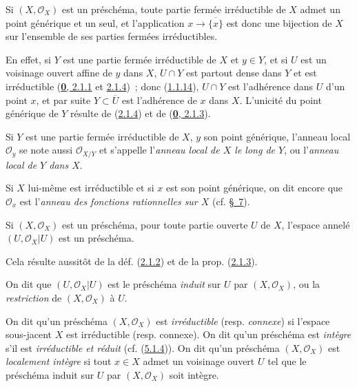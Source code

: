 \begin{proposition}[2.1.5]
\label{I.2.1.5-fr}
Si $(X,\mathscr{O}_X)$ est un préschéma, toute partie fermée irréductible de
$X$ admet un point générique et un seul, et l'application
$x\to\overline{\{x\}}$ est donc une bijection de $X$ sur l'ensemble
de ses parties fermées irréductibles.
\end{proposition}

En effet, si $Y$ est une partie fermée irréductible de $X$ et $y\in Y$, et si
$U$ est un voisinage ouvert affine de $y$ dans $X$, $U\cap Y$ est partout
dense dans $Y$ et est irréductible
(\hyperref[0.2.1.1-fr]{\textbf{0}, 2.1.1} et
\hyperref[0.2.1.4-fr]{2.1.4})~; donc
(\hyperref[I.1.1.14-fr]{1.1.14}), $U\cap Y$ est l'adhérence dans $U$ d'un
point $x$, et par suite $Y\subset\overline{U}$ est l'adhérence de $x$ dans
$X$. L'unicité du point générique de $Y$ résulte de
(\hyperref[I.2.1.4-fr]{2.1.4}) et de
(\hyperref[0.2.1.3-fr]{\textbf{0}, 2.1.3}).

\begin{env}[2.1.6]
\label{I.2.1.6-fr}
Si $Y$ est une partie fermée irréductible de $X$, $y$ son point générique,
l'anneau local $\mathscr{O}_y$ se note aussi $\mathscr{O}_{X/Y}$ et s'appelle
l'\emph{anneau local de $X$ le long de $Y$}, ou l'\emph{anneau local de $Y$
dans $X$}.

Si $X$ lui-même est irréductible et si $x$ est son point générique, on dit
encore que $\mathscr{O}_x$ est l'\emph{anneau des fonctions rationnelles sur
$X$} (cf. \hyperref[section:I.7-fr]{§~7}).
\end{env}

\begin{proposition}[2.1.7]
\label{I.2.1.7-fr}
Si $(X,\mathscr{O}_X)$ est un préschéma, pour toute partie ouverte $U$ de $X$,
l'espace annelé $(U,\mathscr{O}_X|U)$ est un préschéma.
\end{proposition}

Cela résulte aussitôt de la déf. (\hyperref[I.2.1.2-fr]{2.1.2}) et de la prop.
(\hyperref[I.2.1.3-fr]{2.1.3}).

On dit que $(U,\mathscr{O}_X|U)$ est le préschéma \emph{induit} sur $U$ par
$(X,\mathscr{O}_X)$, ou la \emph{restriction} de $(X,\mathscr{O}_X)$ à $U$.

\begin{env}[2.1.8]
\label{I.2.1.8-fr}
On dit qu'un préschéma $(X,\mathscr{O}_X)$ est \emph{irréductible} (resp.
\emph{connexe}) si l'espace sous-jacent $X$ est irréductible (resp. connexe).
On dit qu'un préschéma est \emph{intègre} s'il est \emph{irréductible et
réduit} (cf. (\hyperref[I.5.1.4-fr]{5.1.4})). On dit qu'un préschéma
$(X,\mathscr{O}_X)$ est \emph{localement intègre} si tout $x\in X$ admet un
voisinage ouvert $U$ tel que le préschéma induit sur $U$ par
$(X,\mathscr{O}_X)$ soit intègre.
\end{env}

